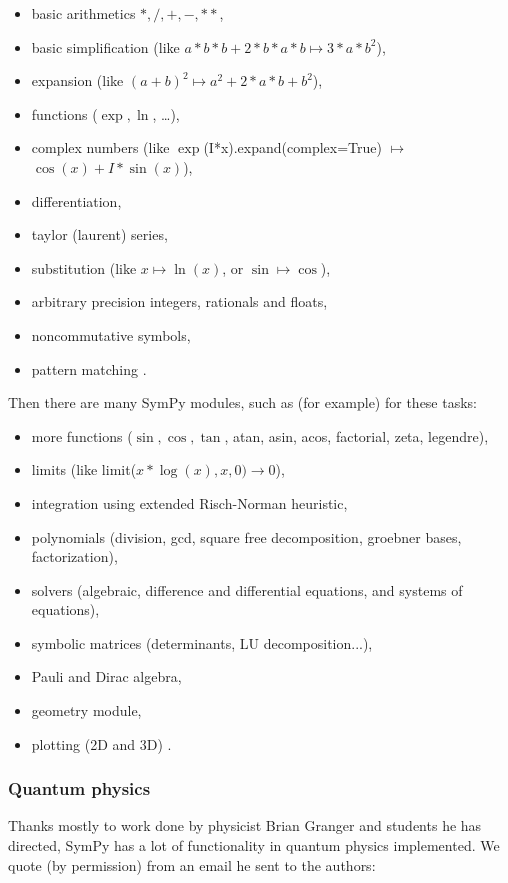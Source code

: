 \documentclass[12pt]{article}
\begin{document}
\begin{itemize}
\item
    basic arithmetics $*,/,+,-,**$,
\item
    basic simplification (like $a*b*b + 2*b*a*b \mapsto 3*a*b^2$),
\item
    expansion (like $(a+b)^2 \mapsto a^2 + 2*a*b + b^2$),
\item
    functions ($\exp, \ln$, \dots),
\item
    complex numbers (like $\exp$(I*x).expand(complex=True) $\mapsto$
    $\cos(x)+I*\sin(x)$),
\item
    differentiation,
\item
    taylor (laurent) series,
\item
    substitution (like $x \mapsto \ln(x)$, or $\sin \mapsto \cos$),
\item
    arbitrary precision integers, rationals and floats,
\item
    noncommutative symbols,
\item
    pattern matching .
\end{itemize}
Then there are many SymPy modules, such as (for example) for these tasks:
\begin{itemize}
\item
    more functions ($\sin, \cos, \tan$, atan, asin, acos, factorial, zeta, legendre),
\item
    limits (like limit($x*\log(x), x, 0) \to 0$),
\item
    integration using extended Risch-Norman heuristic,
\item
    polynomials (division, gcd, square free decomposition, groebner bases, factorization),
\item
    solvers (algebraic, difference and differential equations, and systems of equations),
\item
    symbolic matrices (determinants, LU decomposition...),
\item
  Pauli and Dirac algebra,
\item
    geometry module,
\item
    plotting (2D and 3D) .
\end{itemize}

\subsubsection{Quantum physics}

Thanks mostly to work done by physicist Brian Granger and students
he has directed, SymPy has a lot of functionality in quantum physics
implemented. We quote (by permission) from an email he sent to the authors:
\end{document}
